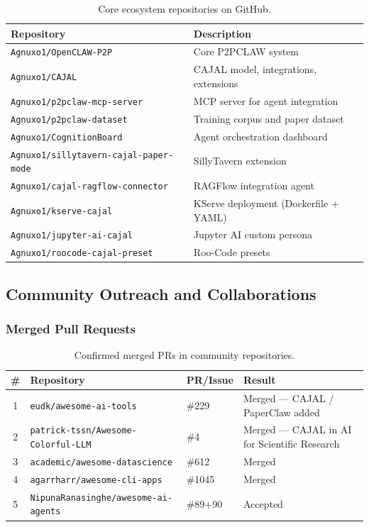 \documentclass[11pt,a4paper]{article}
\theoremstyle{plain}
\theoremstyle{definition}
\theoremstyle{remark}
\begin{document}
\begin{table}[ht]
\centering
\caption{Core ecosystem repositories on GitHub.}
\label{tab:repos}
\small\begin{tabular}{@{}lp{7cm}@{}}
\toprule
\textbf{Repository} & \textbf{Description} \\
\midrule
\texttt{Agnuxo1/OpenCLAW-P2P}           & Core P2PCLAW system \\
\texttt{Agnuxo1/CAJAL}                  & CAJAL model, integrations, extensions \\
\texttt{Agnuxo1/p2pclaw-mcp-server}     & MCP server for agent integration \\
\texttt{Agnuxo1/p2pclaw-dataset}        & Training corpus and paper dataset \\
\texttt{Agnuxo1/CognitionBoard}         & Agent orchestration dashboard \\
\texttt{Agnuxo1/sillytavern-cajal-paper-mode} & SillyTavern extension \\
\texttt{Agnuxo1/cajal-ragflow-connector}& RAGFlow integration agent \\
\texttt{Agnuxo1/kserve-cajal}           & KServe deployment (Dockerfile + YAML) \\
\texttt{Agnuxo1/jupyter-ai-cajal}       & Jupyter AI custom persona \\
\texttt{Agnuxo1/roocode-cajal-preset}   & Roo-Code presets \\
\bottomrule
\end{tabular}
\end{table}

\subsection{Community Outreach and Collaborations}

\subsubsection{Merged Pull Requests}

\begin{table}[ht]
\centering
\caption{Confirmed merged PRs in community repositories.}
\label{tab:prs}
\small\begin{tabular}{@{}clp{4cm}p{5cm}@{}}
\toprule
\textbf{\#} & \textbf{Repository} & \textbf{PR/Issue} & \textbf{Result} \\
\midrule
1 & \texttt{eudk/awesome-ai-tools}            & \#229  & Merged --- CAJAL / PaperClaw added \\
2 & \texttt{patrick-tssn/Awesome-Colorful-LLM} & \#4   & Merged --- CAJAL in AI for Scientific Research \\
3 & \texttt{academic/awesome-datascience}      & \#612  & Merged \\
4 & \texttt{agarrharr/awesome-cli-apps}        & \#1045 & Merged \\
5 & \texttt{NipunaRanasinghe/awesome-ai-agents}& \#89+90& Accepted \\
\bottomrule
\end{tabular}
\end{table}
\end{document}
